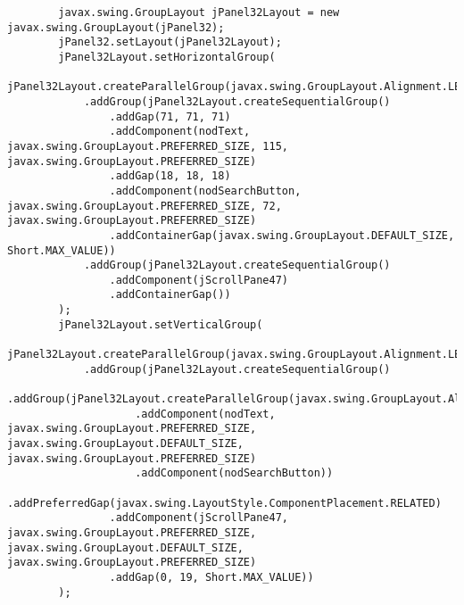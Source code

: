 \documentclass[12pt,a4paper]{article}
\begin{document}
\begin{lstlisting}
        javax.swing.GroupLayout jPanel32Layout = new javax.swing.GroupLayout(jPanel32);
        jPanel32.setLayout(jPanel32Layout);
        jPanel32Layout.setHorizontalGroup(
            jPanel32Layout.createParallelGroup(javax.swing.GroupLayout.Alignment.LEADING)
            .addGroup(jPanel32Layout.createSequentialGroup()
                .addGap(71, 71, 71)
                .addComponent(nodText, javax.swing.GroupLayout.PREFERRED_SIZE, 115, javax.swing.GroupLayout.PREFERRED_SIZE)
                .addGap(18, 18, 18)
                .addComponent(nodSearchButton, javax.swing.GroupLayout.PREFERRED_SIZE, 72, javax.swing.GroupLayout.PREFERRED_SIZE)
                .addContainerGap(javax.swing.GroupLayout.DEFAULT_SIZE, Short.MAX_VALUE))
            .addGroup(jPanel32Layout.createSequentialGroup()
                .addComponent(jScrollPane47)
                .addContainerGap())
        );
        jPanel32Layout.setVerticalGroup(
            jPanel32Layout.createParallelGroup(javax.swing.GroupLayout.Alignment.LEADING)
            .addGroup(jPanel32Layout.createSequentialGroup()
                .addGroup(jPanel32Layout.createParallelGroup(javax.swing.GroupLayout.Alignment.BASELINE)
                    .addComponent(nodText, javax.swing.GroupLayout.PREFERRED_SIZE, javax.swing.GroupLayout.DEFAULT_SIZE, javax.swing.GroupLayout.PREFERRED_SIZE)
                    .addComponent(nodSearchButton))
                .addPreferredGap(javax.swing.LayoutStyle.ComponentPlacement.RELATED)
                .addComponent(jScrollPane47, javax.swing.GroupLayout.PREFERRED_SIZE, javax.swing.GroupLayout.DEFAULT_SIZE, javax.swing.GroupLayout.PREFERRED_SIZE)
                .addGap(0, 19, Short.MAX_VALUE))
        );


\end{lstlisting}
\end{document}
